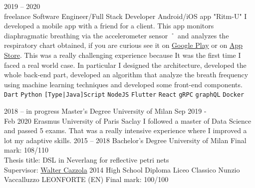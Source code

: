 \documentclass[9pt]{developercv} %
\begin{document}
\begin{entrylist}
	\entry
		{2019 -- 2020\\\footnotesize{freelance}}
		{Software Engineer/Full Stack Developer}
		{Android/iOS app "Ritm-U"}
		{
			I developed a mobile app with a friend for a client. This app 
			monitors diaphragmatic breathing via the accelerometer sensor ˚
			and analyzes the respiratory chart obtained, if you are curious see 
			it on \href{https://play.google.com/store/apps/details?id=com.ritmu.app}{Google Play} or on 
			\href{https://apps.apple.com/us/app/id1514766559}{App Store}. This was a really challenging experience 
			because It was the first time I faced a real world case. In particular 
			I designed the architecture, developed the whole back-end part, 
			developed an algorithm that analyze the breath frequency using machine learning techniques and developed some front-end components.
            \\ 
            \texttt{Dart}\slashsep
            \texttt{Python}\slashsep
            \texttt{[Type|Java]Script}\slashsep
            \texttt{NodeJS}\slashsep
            \texttt{Flutter}\slashsep
            \texttt{React}\slashsep
            \texttt{gRPC}\slashsep
            \texttt{graphQL}\slashsep
            \texttt{Docker}
        }
\end{entrylist}



\begin{entrylist}
	\entry
		{2018 -- in progress}
		{Master's Degree}
		{University of Milan}
		{}
	\entry
		{Sep 2019 - \\Feb 2020}
		{Erasmus}
		{University of Paris Saclay}
		{
			I followed a master of Data Science and passed 5 exams.
			That was a really intensive experience where I improved a lot my adaptive skills. 
		}
	\entry
		{2015 -- 2018}
		{Bachelor's Degree}
		{University of Milan}
		{
			Final mark: 108/110\\
			Thesis title: DSL in Neverlang for reflective petri nets\\
			Supervisor: \href{https://cazzola.di.unimi.it}{Walter Cazzola}
		}
	\entry
		{2014}
		{High School Diploma}
		{Liceo Classico Nunzio Vaccalluzzo LEONFORTE (EN)}
		{
			Final mark: 100/100\\
		}
\end{entrylist}
\end{document}
